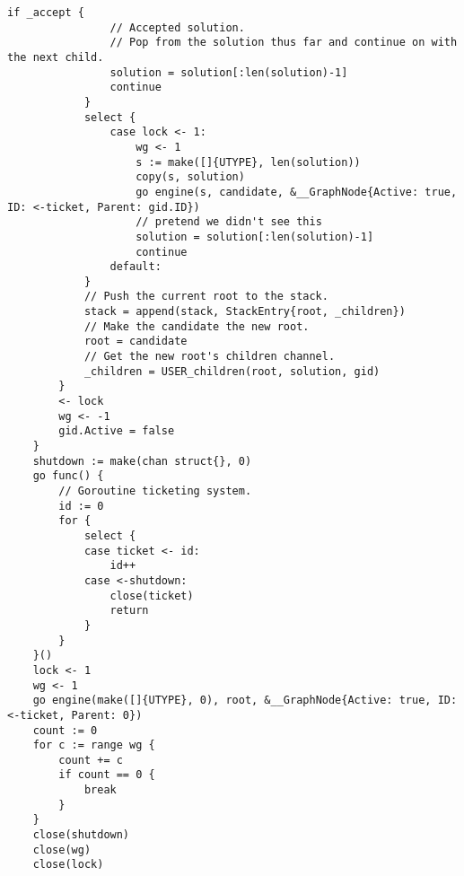 \documentclass[runningheads]{llncs}
\begin{document}
\begin{lstlisting}[language=Golang, style=boxed]
			if _accept {
				// Accepted solution.
				// Pop from the solution thus far and continue on with the next child.
				solution = solution[:len(solution)-1]
				continue
			}
			select {
				case lock <- 1:
					wg <- 1
					s := make([]{UTYPE}, len(solution))
					copy(s, solution)
					go engine(s, candidate, &__GraphNode{Active: true, ID: <-ticket, Parent: gid.ID})
					// pretend we didn't see this
					solution = solution[:len(solution)-1]
					continue
				default:
			}
			// Push the current root to the stack.
			stack = append(stack, StackEntry{root, _children})
			// Make the candidate the new root.
			root = candidate
			// Get the new root's children channel.
			_children = USER_children(root, solution, gid)
		}
		<- lock
		wg <- -1
		gid.Active = false
	}
	shutdown := make(chan struct{}, 0)
	go func() {
		// Goroutine ticketing system.
		id := 0
		for {
			select {
			case ticket <- id:
				id++
			case <-shutdown:
				close(ticket)
				return
			}
		}
	}()
	lock <- 1
	wg <- 1
	go engine(make([]{UTYPE}, 0), root, &__GraphNode{Active: true, ID: <-ticket, Parent: 0})
	count := 0
	for c := range wg {
		count += c
		if count == 0 {
			break
		}
	}
	close(shutdown)
	close(wg)
	close(lock)
\end{lstlisting}
\end{document}
